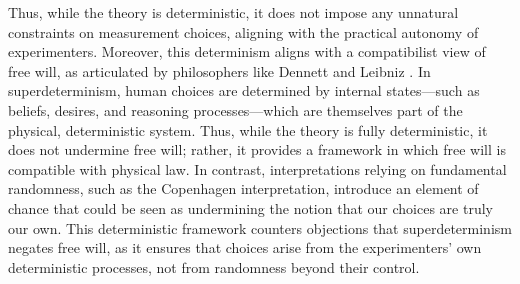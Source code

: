 \documentclass{article}
\begin{document}
Thus, while the theory is deterministic, it does not impose any unnatural constraints on measurement choices, aligning with the practical autonomy of experimenters. Moreover, this determinism aligns with a compatibilist view of free will, as articulated by philosophers like Dennett \cite{Dennett1984} and Leibniz \cite{Leibniz1686}. In superdeterminism, human choices are determined by internal states—such as beliefs, desires, and reasoning processes—which are themselves part of the physical, deterministic system. Thus, while the theory is fully deterministic, it does not undermine free will; rather, it provides a framework in which free will is compatible with physical law. In contrast, interpretations relying on fundamental randomness, such as the Copenhagen interpretation, introduce an element of chance that could be seen as undermining the notion that our choices are truly our own. This deterministic framework counters objections that superdeterminism negates free will, as it ensures that choices arise from the experimenters' own deterministic processes, not from randomness beyond their control.
\end{document}
